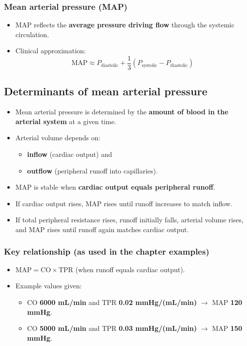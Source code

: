 \documentclass[11pt,a4paper]{article}
\begin{document}
\subsubsection{Mean arterial pressure (MAP)}
\begin{itemize}
\item MAP reflects the \textbf{average pressure driving flow} through the systemic circulation.
\item Clinical approximation:
  \[
  \mathrm{MAP} \approx P_{\text{diastolic}} + \frac{1}{3}\left(P_{\text{systolic}}-P_{\text{diastolic}}\right)
  \]
\end{itemize}

\subsection{Determinants of mean arterial pressure}
\begin{itemize}
\item Mean arterial pressure is determined by the \textbf{amount of blood in the arterial system} at a given time.
\item Arterial volume depends on:
  \begin{itemize}
  \item \textbf{inflow} (cardiac output) and
  \item \textbf{outflow} (peripheral runoff into capillaries).
  \end{itemize}
\item MAP is stable when \textbf{cardiac output equals peripheral runoff}.
\item If cardiac output rises, MAP rises until runoff increases to match inflow.
\item If total peripheral resistance rises, runoff initially falls, arterial volume rises, and MAP rises until runoff again matches cardiac output.
\end{itemize}

\subsubsection{Key relationship (as used in the chapter examples)}
\begin{itemize}
\item \textbf{$\mathrm{MAP} = \mathrm{CO} \times \mathrm{TPR}$} (when runoff equals cardiac output).
\item Example values given:
  \begin{itemize}
  \item CO \textbf{6000 mL/min} and TPR \textbf{0.02 mmHg/(mL/min)} $\rightarrow$ MAP \textbf{120 mmHg}.
  \item CO \textbf{5000 mL/min} and TPR \textbf{0.03 mmHg/(mL/min)} $\rightarrow$ MAP \textbf{150 mmHg}.
  \end{itemize}
\end{itemize}
\end{document}

